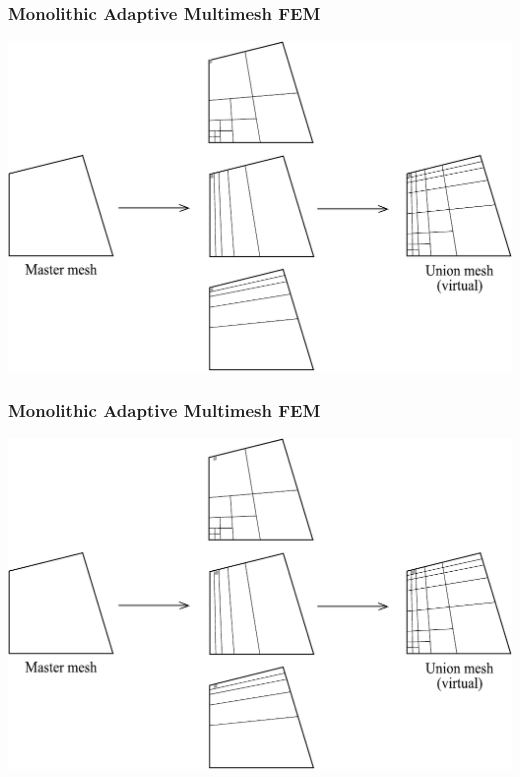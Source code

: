 \begin{frame}
  \frametitle{Monolithic Adaptive Multimesh FEM}
  \begin{center}
    \includegraphics[height=0.7\textheight]{multimesh/mm_30.pdf}
  \end{center}
\end{frame}

\begin{frame}
  \frametitle{Monolithic Adaptive Multimesh FEM}
  \begin{center}
    \includegraphics[height=0.7\textheight]{multimesh/mm_31.pdf}
  \end{center}
\end{frame}

